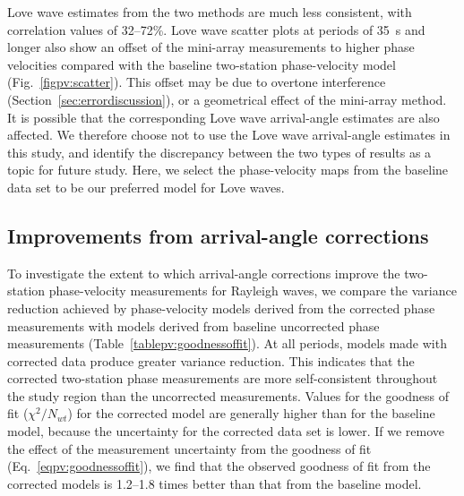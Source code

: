 \documentclass[12pt,oneside]{book}
\begin{document}
Love wave estimates from the two methods are much less consistent, with correlation values of 32\nobreakdash--72\%. Love wave scatter plots at periods of 35~s and longer also show an offset of the mini-array measurements to higher phase velocities compared with the baseline two-station phase-velocity model (Fig.~\ref{figpv:scatter}). This offset may be due to overtone interference (Section~\ref{sec:errordiscussion}), or a geometrical effect of the mini-array method. It is possible that the corresponding Love wave arrival-angle estimates are also affected. We therefore choose not to use the Love wave arrival-angle estimates in this study, and identify the discrepancy between the two types of results as a topic for future study. Here, we select the phase-velocity maps from the baseline data set to be our preferred model for Love waves. 

\subsection{Improvements from arrival-angle corrections}\label{sec:aaimprove}

To investigate the extent to which arrival-angle corrections improve the two-station phase-velocity measurements for Rayleigh waves, we compare the variance reduction achieved by phase-velocity models derived from the corrected phase measurements with models derived from baseline uncorrected phase measurements (Table~\ref{tablepv:goodnessoffit}). At all periods, models made with corrected data produce greater variance reduction. This indicates that the corrected two-station phase measurements are more self-consistent throughout the study region than the uncorrected measurements. Values for the goodness of fit ($\chi^2/N_{wt}$) for the corrected model are generally higher than for the baseline model, because the uncertainty for the corrected data set is lower. If we remove the effect of the measurement uncertainty from the goodness of fit (Eq.~\ref{eqpv:goodnessoffit}), we find that the observed goodness of fit from the corrected models is 1.2--1.8 times better than that from the baseline model. 
\end{document}
